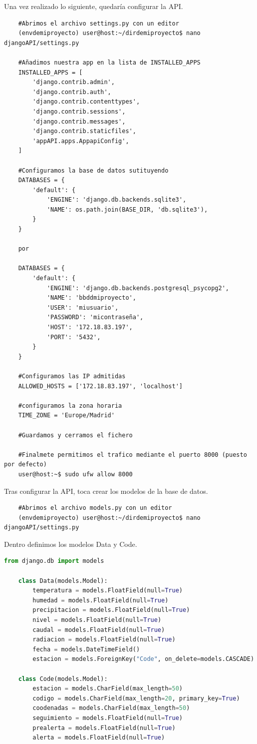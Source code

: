 Una vez realizado lo siguiente, quedaría configurar la API.

\begin{verbatim}
	#Abrimos el archivo settings.py con un editor
	(envdemiproyecto) user@host:~/dirdemiproyecto$ nano djangoAPI/settings.py
	
	#Añadimos nuestra app en la lista de INSTALLED_APPS
	INSTALLED_APPS = [
		'django.contrib.admin',
		'django.contrib.auth',
		'django.contrib.contenttypes',
		'django.contrib.sessions',
		'django.contrib.messages',
		'django.contrib.staticfiles',
		'appAPI.apps.AppapiConfig',
	]
	
	#Configuramos la base de datos sutituyendo
	DATABASES = {
		'default': {
			'ENGINE': 'django.db.backends.sqlite3',
			'NAME': os.path.join(BASE_DIR, 'db.sqlite3'),
		}
	}

	por

	DATABASES = {
		'default': {
			'ENGINE': 'django.db.backends.postgresql_psycopg2',
			'NAME': 'bbddmiproyecto',
			'USER': 'miusuario',
			'PASSWORD': 'micontraseña',
			'HOST': '172.18.83.197',
			'PORT': '5432',
		}
	}

	#Configuramos las IP admitidas
	ALLOWED_HOSTS = ['172.18.83.197', 'localhost']
	
	#configuramos la zona horaria
	TIME_ZONE = 'Europe/Madrid'
	
	#Guardamos y cerramos el fichero
	
	#Finalmete permitimos el trafico mediante el puerto 8000 (puesto por defecto)
	user@host:~$ sudo ufw allow 8000
\end{verbatim}

Tras configurar la API, toca crear los modelos de la base de datos.

\begin{verbatim}
	#Abrimos el archivo models.py con un editor
	(envdemiproyecto) user@host:~/dirdemiproyecto$ nano djangoAPI/settings.py
\end{verbatim}

Dentro definimos los modelos Data y Code.

\begin{lstlisting}[language=Python, caption={Modelos Django}]
	from django.db import models
	
	class Data(models.Model):
		temperatura = models.FloatField(null=True)
		humedad = models.FloatField(null=True)
		precipitacion = models.FloatField(null=True)
		nivel = models.FloatField(null=True)
		caudal = models.FloatField(null=True)
		radiacion = models.FloatField(null=True)
		fecha = models.DateTimeField()
		estacion = models.ForeignKey("Code", on_delete=models.CASCADE)
	
	class Code(models.Model):
		estacion = models.CharField(max_length=50)
		codigo = models.CharField(max_length=20, primary_key=True)
		coodenadas = models.CharField(max_length=50)
		seguimiento = models.FloatField(null=True)
		prealerta = models.FloatField(null=True)
		alerta = models.FloatField(null=True)
\end{lstlisting}

